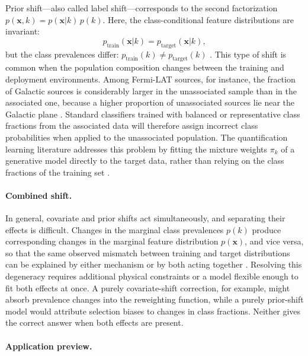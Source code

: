 Prior shift---also called label shift---corresponds to the second factorization $p(\mathbf{x}, k) = p(\mathbf{x}|k)\,p(k)$. Here, the class-conditional feature distributions are invariant:
\begin{equation}
p_{\text{train}}(\mathbf{x}|k) = p_{\text{target}}(\mathbf{x}|k),
\label{eq:prior_shift}
\end{equation}
but the class prevalences differ: $p_{\text{train}}(k) \neq p_{\text{target}}(k)$ \cite{MorenoTorres:2012}. This type of shift is common when the population composition changes between the training and deployment environments. Among Fermi-LAT sources, for instance, the fraction of Galactic sources is considerably larger in the unassociated sample than in the associated one, because a higher proportion of unassociated sources lie near the Galactic plane \cite{Amerio:2025sub}. Standard classifiers trained with balanced or representative class fractions from the associated data will therefore assign incorrect class probabilities when applied to the unassociated population. The quantification learning literature \cite{Gonzalez:2017} addresses this problem by fitting the mixture weights $\pi_k$ of a generative model directly to the target data, rather than relying on the class fractions of the training set \cite{Saerens:2002, Moreo:2024}.

\paragraph{Combined shift.}

In general, covariate and prior shifts act simultaneously, and separating their effects is difficult. Changes in the marginal class prevalences $p(k)$ produce corresponding changes in the marginal feature distribution $p(\mathbf{x})$, and vice versa, so that the same observed mismatch between training and target distributions can be explained by either mechanism or by both acting together \cite{MorenoTorres:2012}. Resolving this degeneracy requires additional physical constraints or a model flexible enough to fit both effects at once. A purely covariate-shift correction, for example, might absorb prevalence changes into the reweighting function, while a purely prior-shift model would attribute selection biases to changes in class fractions. Neither gives the correct answer when both effects are present.

\paragraph{Application preview.}

